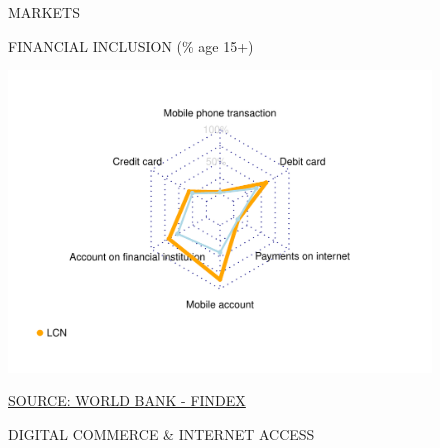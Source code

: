 \documentclass{article}\usepackage[]{graphicx}\usepackage[]{color}
\makeatletter
\def\maxwidth{ %
  \ifdim\Gin@nat@width>\linewidth
    \linewidth
  \else
    \Gin@nat@width
  \fi
}
\makeatother
\begin{document}
\begin{figure}
\begin{minipage}[c]{0.95\textwidth}
  \vspace{5ex}
  \begin{minipage}[b]{0.95\textwidth}
    \begin{flushleft}  
      \Large{\textcolor[HTML]{22A6F5}{MARKETS}}
    \end{flushleft}
    \begin{minipage}[c]{0.48\textwidth} %
      \small{\textcolor[HTML]{818181}{FINANCIAL INCLUSION \footnotesize(\% age 15+)}}
      \vspace*{-0.6cm}


{\centering \includegraphics[width=\maxwidth]{figure/radar_chart_Markets-1} 

}



      \vspace*{-0.6cm} 
      \scriptsize{\href{http://www.worldbank.org/en/programs/globalfindex}{\textcolor[HTML]{22A6F5}{SOURCE: WORLD BANK - FINDEX}}}
    \end{minipage}
    \begin{minipage}[c]{0.50\textwidth} %
      \small{\textcolor[HTML]{818181}{DIGITAL COMMERCE \& INTERNET ACCESS}}
      \\[8pt]
      \begin{minipage}[c]{0.99\textwidth} %



\end{minipage}
\end{minipage}
\end{minipage}
\end{minipage}
\end{figure}
\end{document}
